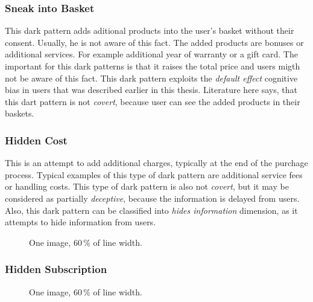         \subsubsection*{Sneak into Basket}
        This dark pattern adds aditional products into the user's basket without their consent. Usually, he is not aware of this fact. The added products are bonuses or additional services. For example additional year of warranty or a gift card. The important for this dark patterns is that it raises the total price and users migth not be aware of this fact. This dark pattern exploits the \emph{default effect} cognitive bias in users that was described earlier in this thesis. Literature here says, that this dart pattern is not \emph{covert}, because user can see the added products in their baskets.
        \subsubsection*{Hidden Cost}
        This is an attempt to add additional charges, typically at the end of the purchage process. Typical examples of this type of dark pattern are additional service fees or handling costs. This type of dark pattern is also not \emph{covert}, but it may be considered as partially \emph{deceptive}, because the information is delayed from users. Also, this dark pattern can be classified into \emph{hides information} dimension, as it attempts to hide information from users.
        \begin{figure}
            \centering
            \caption{One image, $60\,\%$ of line width.  
              }
            \label{fig:TODO}
        \end{figure}
        \subsubsection*{Hidden Subscription}
        \blind[1]
        \begin{figure}
            \centering
            \caption{One image, $60\,\%$ of line width.  
              }
            \label{fig:TODO}
        \end{figure}
